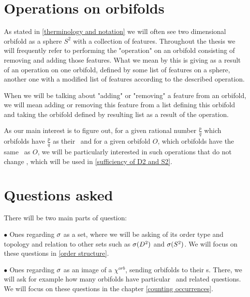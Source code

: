 \section{Operations on orbifolds}\label{Operations}
As stated in \ref{therminology and notation} we will often see two dimensional orbifold 
as a sphere $S^2$ with a collection of features.
Throughout the thesis we will frequently refer to performing the "operation" on an orbifold 
consisting of removing and adding those features. 
What we mean by this is giving as a result of an operation on one orbifold, defined 
by some list of features on a sphere, another one 
with a modified list of features according to the described operation. 

When we will be talking about "adding" or "removing" a feature from an orbifold, we 
will mean adding or removing this feature from a list defining this orbifold and 
taking the orbifold defined by resulting list as a result of the operation.
 
As our main interest is to figure out, for a given rational number 
$\frac{p}{q}$ which orbifolds have $\frac{p}{q}$ as their \Eoc\ and for a given 
orbifold $O$, which orbifolds 
have the same \Eoc\ as $O$, we will be particularly interested in such operations 
that do not change \Eoc, which will be used in \ref{sufficiency of D2 and S2}.





\label{moving from interior to boundary}


\section{Questions asked}
There will be two main parts of question: 

$\bullet$ Ones regarding ${\sigma}$ as a set, where we will be asking 
of its order type and topology and relation to other sets such as ${{\sigma}(D^2)}$ and ${{\sigma}(S^2)}$. 
We will focus on these questions in \ref{order structure}. 

$\bullet$ Ones regarding ${\sigma}$ as an image of a $\chi^{orb}$, sending orbifolds to their \Eoc s. 
There, we will ask for example how many orbifolds have particular \Eoc\ and 
related questions. We will focus on these questions in the chapter \ref{counting occurrences}.  






